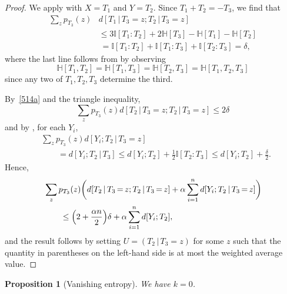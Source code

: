 \documentclass[10pt,a4paper]{article}
\newtheorem{proposition}[theorem]{Proposition}
\newcommand{\lean}[1]{}
\newcommand{\uses}[1]{}
\newcommand{\leanok}{}
\newcommand{\bbH}{\mathbb{H}}
\newcommand{\bbI}{\mathbb{I}}
\begin{document}
\begin{proof}\uses{entropic-bsg, relabeled-entropy, first-useful}\leanok
  We apply  with $X=T_1$ and $Y=T_2$.
  Since $T_1+T_2=-T_3$, we find that
  \begin{equation}\label{514a}
  \begin{split}
    \sum_{z} p_{T_3}(z) & d[T_1 \,|\, T_3 \mathop{=} z;T_2 \,|\, T_3 \mathop{=} z] \\
    &\leq  3 \bbI[T_1 : T_2] + 2 \bbH[T_3] - \bbH[T_1] - \bbH[T_2] \\
    &\ = \bbI[T_1 : T_2] + \bbI[T_1 : T_3] + \bbI[T_2 : T_3]
    = \delta,
  \end{split}
\end{equation}
  where the last line follows from  by observing
  \[
    \bbH[T_1,T_2] = \bbH[T_1,T_3] = \bbH[T_2,T_3] = \bbH[T_1,T_2,T_3]
  \]
  since any two of $T_1,T_2,T_3$ determine the third.

  By~\eqref{514a} and the triangle inequality,
  \[
    \sum_z p_{T_3}(z) d[T_2 \,|\, T_3 \mathop{=} z; T_2 \,|\, T_3\mathop{=}z] \leq 2 \delta
  \]
  and by , for each $Y_i$,
  \begin{align*}
    &\sum_z p_{T_3}(z) d[Y_i; T_2 \,|\, T_3 \mathop{=} z] \\
    &\qquad= d[Y_i; T_2 \,|\, T_3]
                                    \leq d[Y_i;T_2] + \frac12 \bbI[T_2 : T_3]
                                    \leq d[Y_i;T_2] + \frac{\delta}{2}.
  \end{align*}
  Hence,
  \begin{align*}
    &\sum_z p_{T_3}(z) \bigg( d[T_2 \,|\, T_3 \mathop{=} z; T_2 \,|\, T_3 \mathop{=} z] + \alpha \sum_{i=1}^n d[Y_i;T_2 \,|\, T_3 \mathop{=} z] \bigg) \\
    &\qquad \leq
    \Bigl(2 + \frac{\alpha n}{2} \Bigr) \delta + \alpha \sum_{i=1}^n d[Y_i; T_2],
  \end{align*}
  and the result follows by setting $U=(T_2 \,|\, T_3 \mathop{=} z)$ for some $z$ such that the quantity in parentheses on the left-hand side is at most the weighted average value.
\end{proof}

\begin{proposition}[Vanishing entropy]\label{k-vanish}\lean{k_eq_zero}\leanok  We have $k = 0$.
\end{proposition}
\end{document}
